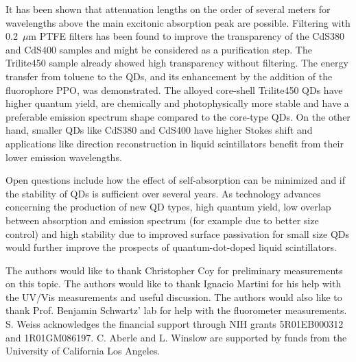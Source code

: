 \documentclass[cits]{JINST}
\begin{document}
It has been shown that attenuation lengths on the order of several meters for wavelengths above the main excitonic absorption peak are possible. Filtering with 0.2~$\mu$m PTFE filters has been found to improve the transparency of the CdS380 and CdS400 samples and might be considered as a purification step. The Trilite450 sample already showed high transparency without filtering. The energy transfer from toluene to the QDs, and its enhancement by the addition of the fluorophore PPO, was demonstrated. The alloyed core-shell Trilite450 QDs have higher quantum yield, are chemically and photophysically more stable and have a preferable emission spectrum shape compared to the core-type QDs. On the other hand, smaller QDs like CdS380 and CdS400 have higher Stokes shift and applications like direction reconstruction in liquid scintillators benefit from their lower emission wavelengths. 

Open questions include how the effect of self-absorption can be minimized and if the stability of QDs is sufficient over several years. As technology advances concerning the production of new QD types, high quantum yield, low overlap between absorption and emission spectrum (for example due to better size control) and high stability due to improved surface passivation for small size QDs would further improve the prospects of quantum-dot-doped liquid scintillators.

\acknowledgments
The authors would like to thank Christopher Coy for preliminary measurements on this topic. The authors would like to thank Ignacio Martini for his help with the UV/Vis measurements and useful discussion. The authors would also like to thank Prof. Benjamin Schwartz' lab for help with the fluorometer measurements. S. Weiss acknowledges the financial support through NIH grants 5R01EB000312 and 1R01GM086197. C. Aberle and L. Winslow are supported by funds from the University of California Los Angeles.
\end{document}
